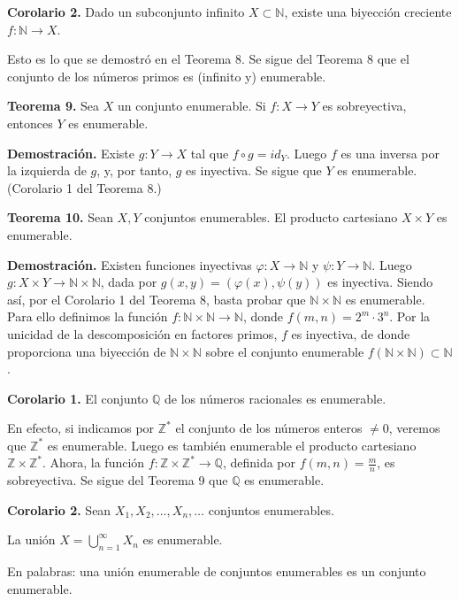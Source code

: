 \textbf{Corolario 2.} Dado un subconjunto infinito \( X \subset \mathbb{N} \), existe una biyección creciente \( f: \mathbb{N} \to X \).

Esto es lo que se demostró en el Teorema 8.
Se sigue del Teorema 8 que el conjunto de los números primos es (infinito y) enumerable.

\textbf{Teorema 9.} Sea \( X \) un conjunto enumerable. Si \( f: X \to Y \) es sobreyectiva, entonces \( Y \) es enumerable.

\textbf{Demostración.} Existe \( g: Y \to X \) tal que \( f \circ g = id_Y \). Luego \( f \) es una inversa por la izquierda de \( g \), y, por tanto, \( g \) es inyectiva. Se sigue que \( Y \) es enumerable. (Corolario 1 del Teorema 8.)

\textbf{Teorema 10.} Sean \( X, Y \) conjuntos enumerables. El producto cartesiano \( X \times Y \) es enumerable.

\textbf{Demostración.} Existen funciones inyectivas \( \varphi: X \to \mathbb{N} \) y \( \psi: Y \to \mathbb{N} \). Luego \( g: X \times Y \to \mathbb{N} \times \mathbb{N} \), dada por \( g(x, y) = (\varphi(x), \psi(y)) \) es inyectiva. Siendo así, por el Corolario 1 del Teorema 8, basta probar que \( \mathbb{N} \times \mathbb{N} \) es enumerable. Para ello definimos la función \( f: \mathbb{N} \times \mathbb{N} \to \mathbb{N} \), donde \( f(m, n) = 2^m \cdot 3^n \). Por la unicidad de la descomposición en factores primos, \( f \) es inyectiva, de donde proporciona una biyección de \( \mathbb{N} \times \mathbb{N} \) sobre el conjunto enumerable \( f(\mathbb{N} \times \mathbb{N}) \subset \mathbb{N} \).

\textbf{Corolario 1.} El conjunto \( \mathbb{Q} \) de los números racionales es enumerable.

En efecto, si indicamos por \( \mathbb{Z}^* \) el conjunto de los números enteros \( \neq 0 \), veremos que \( \mathbb{Z}^* \) es enumerable. Luego es también enumerable el producto cartesiano \( \mathbb{Z} \times \mathbb{Z}^* \). Ahora, la función \( f: \mathbb{Z} \times \mathbb{Z}^* \to \mathbb{Q} \), definida por \( f(m, n) = \frac{m}{n} \), es sobreyectiva. Se sigue del Teorema 9 que \( \mathbb{Q} \) es enumerable.

\textbf{Corolario 2.} Sean \( X_1, X_2, \dots, X_n, \dots \) conjuntos enumerables.

La unión \( X = \bigcup_{n=1}^{\infty} X_n \) es enumerable.

En palabras: una unión enumerable de conjuntos enumerables es un conjunto enumerable.

